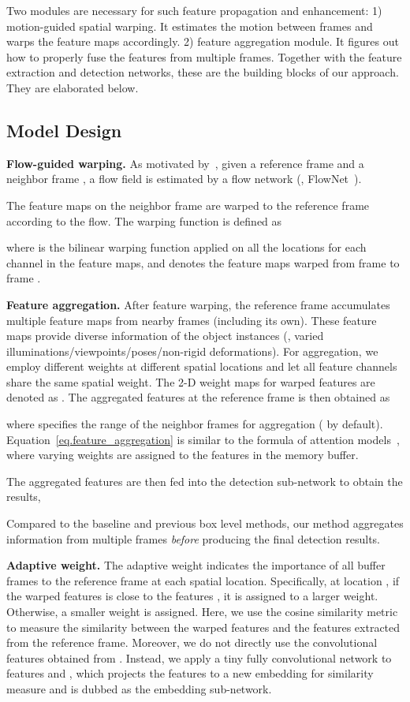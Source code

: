 \documentclass[10pt,twocolumn,letterpaper]{article}
\begin{document}
Two modules are necessary for such feature propagation and enhancement: 1) motion-guided spatial warping. It estimates the motion between frames and warps the feature maps accordingly. 2) feature aggregation module. It figures out how to properly fuse the features from multiple frames. Together with the feature extraction and detection networks, these are the building blocks of our approach. They are elaborated below.


\subsection{Model Design}
\textbf{Flow-guided warping.} As motivated by~\cite{zhu2016dff}, given a reference frame  and a neighbor frame , a flow field  is estimated by a flow network  (\eg, FlowNet~\cite{dosovitskiy2015flownet}).

The feature maps on the neighbor frame are warped to the reference frame according to the flow. The warping function is defined as

where  is the bilinear warping function applied on all the locations for each channel in the feature maps, and  denotes the feature maps warped from frame  to frame .

\textbf{Feature aggregation.} After feature warping, the reference frame accumulates multiple feature maps from nearby frames (including its own). These feature maps provide diverse information of the object instances (\eg, varied illuminations/viewpoints/poses/non-rigid deformations). For aggregation, we employ different weights at different spatial locations and let all feature channels share the same spatial weight. The 2-D weight maps for warped features  are denoted as . The aggregated features at the reference frame  is then obtained as

where  specifies the range of the neighbor frames for aggregation ( by default). Equation~\eqref{eq.feature_aggregation} is similar to the formula of attention models~\cite{rush2015attention}, where varying weights are assigned to the features in the memory buffer.

The aggregated features  are then fed into the detection sub-network to obtain the results,


Compared to the baseline and previous box level methods, our method aggregates information from multiple frames \emph{before} producing the final detection results.

\textbf{Adaptive weight.} The adaptive weight indicates the importance of all buffer frames  to the reference frame  at each spatial location. Specifically, at location , if the warped features  is close to the features , it is assigned to a larger weight. Otherwise, a smaller weight is assigned. Here, we use the cosine similarity metric~\cite{luo2017cosine} to measure the similarity between the warped features and the features extracted from the reference frame. Moreover, we do not directly use the convolutional features obtained from . Instead, we apply a tiny fully convolutional network  to features  and , which projects the features to a new embedding for similarity measure and is dubbed as the embedding sub-network.
\end{document}
